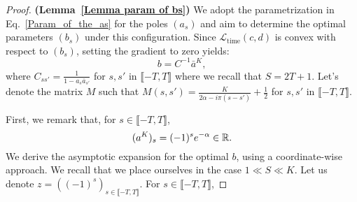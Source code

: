\begin{proof}\textbf{(Lemma~\ref{Lemma param of bs})} \hspace*{.15cm}
We adopt the parametrization in Eq.~\eqref{Param_of_the_as} for the poles \((a_s)\) and aim to determine the optimal parameters \((b_s)\) under this configuration. Since $\mathcal{L}_\text{time}(c, d)$ is convex with respect to \((b_s)\), setting the gradient to zero yields:
\[
b = C^{-1} \bar{a}^K,
\]
where \(C_{ss'} = \frac{1}{1 - a_s \bar{a}_{s'}}\) for $s, s'$ in $\llbracket -T, T\rrbracket$ where we recall that $S = 2T+1$. 
Let's denote the matrix $M$ such that $M(s, s') = \frac{K}{2\alpha - i\pi(s-s')} + \frac{1}{2}$ for $s, s'$ in $\llbracket -T, T\rrbracket$. 

First, we remark that, for $s\in\llbracket-T, T\rrbracket$, 
\[
(a^K)_s= (-1)^se^{-\alpha}\in\mathbb{{R}}.
\]
We derive the asymptotic expansion for the optimal $b$, using a coordinate-wise approach. We recall that we place ourselves in the case $1\ll S \ll K$. Let us denote $z=((-1)^s)_{s\in\llbracket -T, T\rrbracket}$. For $s\in\llbracket-T, T\rrbracket$,


\end{proof}

